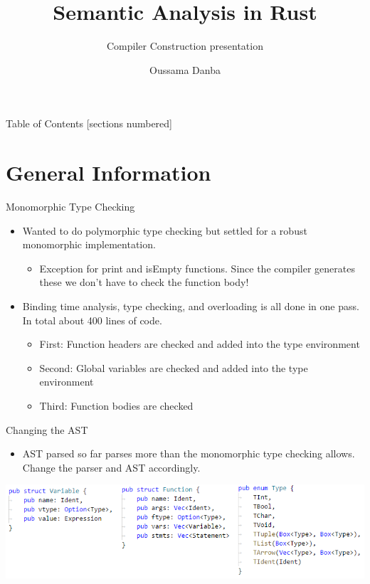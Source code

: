 \documentclass[10pt]{beamer}
\title{Semantic Analysis in Rust}
\subtitle{Compiler Construction presentation}
\date{}
\author{Oussama Danba}
\begin{document}
\maketitle

\begin{frame}{Table of Contents}
  [sections numbered]
  \tableofcontents[hideallsubsections]
\end{frame}

\section{General Information}
\begin{frame}{Monomorphic Type Checking}
    \begin{itemize}
        \item Wanted to do polymorphic type checking but settled for a robust monomorphic implementation.
        \begin{itemize}
            \item Exception for print and isEmpty functions. Since the compiler generates these we don't have to check the function body!
        \end{itemize}
        \item Binding time analysis, type checking, and overloading is all done in one pass. In total about 400 lines of code.
        \begin{itemize}
            \item First: Function headers are checked and added into the type environment
            \item Second: Global variables are checked and added into the type environment
            \item Third: Function bodies are checked
        \end{itemize}
    \end{itemize}
\end{frame}

\begin{frame}{Changing the AST}
    \begin{itemize}
        \item AST parsed so far parses more than the monomorphic type checking allows. Change the parser and AST accordingly.
    \end{itemize}
    \includegraphics[width=\textwidth]{presentation2/AST.png}
\end{frame}
\end{document}
